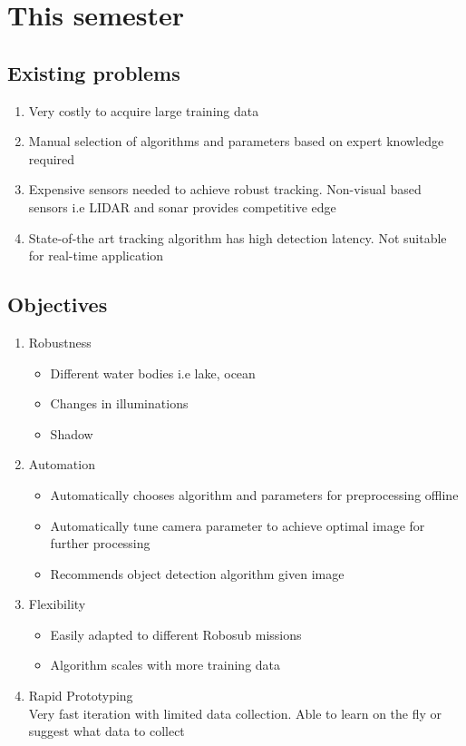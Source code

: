 \chapter{This semester}

\section{Existing problems}

\begin{enumerate}
    \item Very costly to acquire large training data
    \item Manual selection of algorithms and parameters based on expert
          knowledge required
    \item Expensive sensors needed to achieve robust tracking. Non-visual based
          sensors i.e LIDAR and sonar provides competitive edge
    \item State-of-the art tracking algorithm has high detection latency. Not
         suitable for real-time application 
\end{enumerate}

\section{Objectives}

\begin{enumerate}
    \item Robustness
        \begin{itemize}
            \item Different water bodies i.e lake, ocean
            \item Changes in illuminations
            \item Shadow
        \end{itemize}
    \item Automation
        \begin{itemize}
            \item Automatically chooses algorithm and parameters for
                  preprocessing offline
            \item Automatically tune camera parameter to achieve optimal image
                  for further processing
            \item Recommends object detection algorithm given image
        \end{itemize}
    \item Flexibility
        \begin{itemize}
            \item Easily adapted to different Robosub missions
            \item Algorithm scales with more training data
        \end{itemize}
    \item Rapid Prototyping \\
        Very fast iteration with limited data collection. Able to learn on the
        fly or suggest what data to collect
\end{enumerate}

